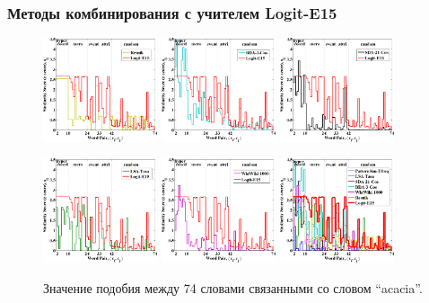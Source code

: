 \documentclass{beamer}
\begin{document}
\begin{frame}
\frametitle{Методы комбинирования с учителем Logit-E15}
\begin{figure}
\centering
\includegraphics[width=0.30\textwidth]{figures/acacia-resnik} 
\includegraphics[width=0.30\textwidth]{figures/acacia-bda}
\includegraphics[width=0.30\textwidth]{figures/acacia-sda}

\includegraphics[width=0.30\textwidth]{figures/acacia-lsa}
\includegraphics[width=0.30\textwidth]{figures/acacia-ww}
\includegraphics[width=0.30\textwidth]{figures/acacia}
\caption{ Значение подобия между 74 словами связанными со словом ``acacia''.
}
\label{fig:hybrid-complimentary-discussion}
\end{figure}

\end{frame}
\end{document}
